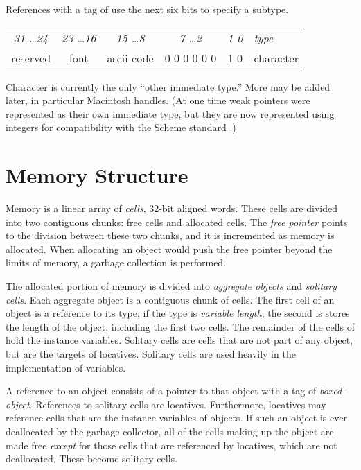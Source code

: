 References with a tag of   use the next six bits to
specify a subtype.
\begin{center}
\begin{tabular}{|c|c|c|c|c|l}
\cline{1-5}
{\em 31 \ldots 24} & {\em 23 \ldots 16} & {\em 15 \ldots 8} &
{\em 7 \ldots 2} & {\em 1 0} & \multicolumn{1}{l}{\em type} \\ \cline{1-5}
 reserved & font & ascii code & 0 0 0 0 0 0 & 1 0 & character\\ \cline{1-5}
\end{tabular}
\end{center}
Character is currently the only ``other immediate type.''  More may be
added later, in particular Macintosh handles.  (At one time weak
pointers were represented as their own immediate type, but they are
now represented using integers for compatibility with the Scheme
standard \cite{R3RS}.)


\section{Memory Structure}

Memory is a linear array of {\em cells}, 32-bit aligned words.  These
cells are divided into two contiguous chunks: free cells and allocated
cells.  The {\em free pointer} points to the division between these
two chunks, and it is incremented as memory is allocated.  When
allocating an object would push the free pointer beyond the limits of
memory, a garbage collection is performed.

The allocated portion of memory is divided into {\em aggregate
objects} and {\em solitary cells}.  Each aggregate object is a
contiguous chunk of cells.  The first cell of an object is a reference
to its type; if the type is {\em variable length}, the second is
stores the length of the object, including the first two cells.  The
remainder of the cells of hold the instance variables.  Solitary cells
are cells that are not part of any object, but are the targets of
locatives.  Solitary cells are used heavily in the implementation of
variables.

A reference to an object consists of a pointer to that object with a
tag of {\em boxed-object}.  References to solitary cells are locatives.
Furthermore, locatives may reference cells that are the instance
variables of objects.  If such an object is ever deallocated by the
garbage collector, all of the cells making up the object are made free
{\em except} for those cells that are referenced by locatives, which are
not deallocated.  These become solitary cells.

